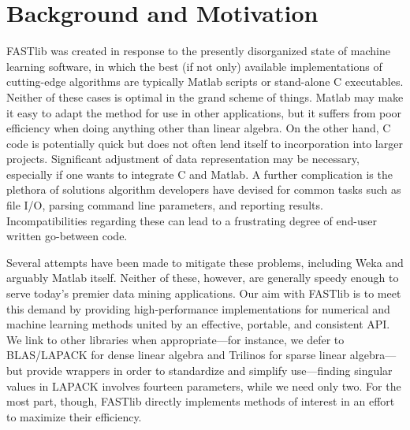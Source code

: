 \documentclass[letter]{report}
\begin{document}
\section {Background and Motivation}
FASTlib was created in response to the presently disorganized state of
machine learning software, in which the best (if not only) available
implementations of cutting-edge algorithms are typically Matlab
scripts or stand-alone C executables.  Neither of these cases is
optimal in the grand scheme of things.  Matlab may make it easy to
adapt the method for use in other applications, but it suffers from
poor efficiency when doing anything other than linear algebra.  On the
other hand, C code is potentially quick but does not often lend itself
to incorporation into larger projects.  Significant adjustment of data
representation may be necessary, especially if one wants to integrate
C and Matlab.  A further complication is the plethora of solutions
algorithm developers have devised for common tasks such as file I/O,
parsing command line parameters, and reporting results.
Incompatibilities regarding these can lead to a frustrating degree of
end-user written go-between code.

Several attempts have been made to mitigate these problems, including
Weka and arguably Matlab itself.  Neither of these, however, are
generally speedy enough to serve today's premier data mining
applications.  Our aim with FASTlib is to meet this demand by
providing high-performance implementations for numerical and machine
learning methods united by an effective, portable, and consistent API.
We link to other libraries when appropriate---for instance, we defer
to BLAS/LAPACK  for dense linear algebra and Trilinos for sparse 
linear algebra---but
provide wrappers in order to standardize and simplify use---finding
singular values in LAPACK involves fourteen parameters, while we need
only two.  For the most part, though, FASTlib directly implements
methods of interest in an effort to maximize their efficiency.
\end{document}
